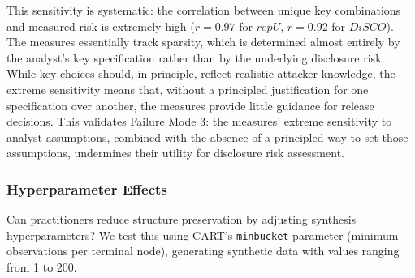 \documentclass[Afour,sageh,times,doublespace]{sagej}
\begin{document}
This sensitivity is systematic: the correlation between unique key combinations and measured risk is extremely high ($r = 0.97$ for $repU$, $r = 0.92$ for $DiSCO$). The measures essentially track sparsity, which is determined almost entirely by the analyst's key specification rather than by the underlying disclosure risk. While key choices should, in principle, reflect realistic attacker knowledge, the extreme sensitivity means that, without a principled justification for one specification over another, the measures provide little guidance for release decisions. This validates Failure Mode 3: the measures' extreme sensitivity to analyst assumptions, combined with the absence of a principled way to set those assumptions, undermines their utility for disclosure risk assessment.

\subsubsection{Hyperparameter Effects}
\label{sec:minbucket_effect}

Can practitioners reduce structure preservation by adjusting synthesis hyperparameters? We test this using CART's \texttt{minbucket} parameter (minimum observations per terminal node), generating synthetic data with values ranging from 1 to 200.

\begin{table}[h]
\footnotesize\sf\centering
\caption{Effect of CART \texttt{minbucket} parameter on structure preservation and disclosure risk. Higher \texttt{minbucket} values reduce structure preservation (i.e., more novel combinations) and the measured disclosure risk.\label{tab:minbucket_effect}}
\end{table}
\end{document}
